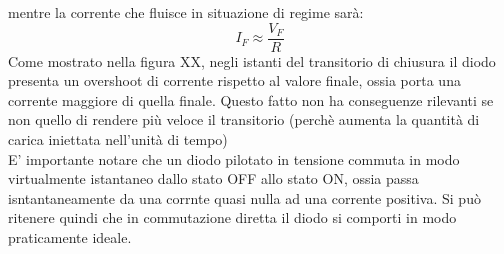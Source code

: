 mentre la corrente che fluisce in situazione di regime sarà:
%
\begin{equation}
    I_F \approx \dfrac{V_F}{R}
\end{equation}
%
Come mostrato nella figura XX, negli istanti del transitorio di chiusura il diodo presenta un overshoot di corrente rispetto al valore finale, ossia porta una corrente maggiore di quella finale.
Questo fatto non ha conseguenze rilevanti se non quello di rendere più veloce il transitorio (perchè aumenta la quantità di carica iniettata nell'unità di tempo)\\
E' importante notare che un diodo pilotato in tensione commuta in modo virtualmente istantaneo dallo stato OFF allo stato ON, ossia passa isntantaneamente da una corrnte quasi nulla ad una corrente positiva. Si può ritenere quindi che in commutazione diretta il diodo si comporti in modo praticamente ideale.


